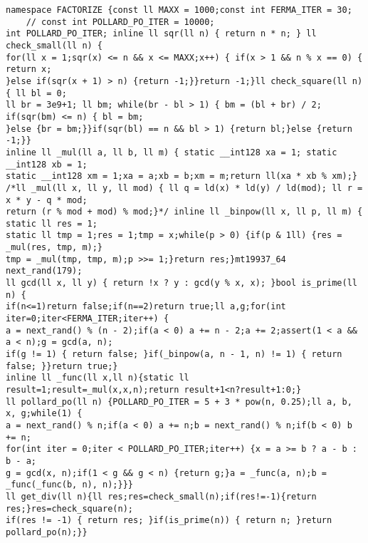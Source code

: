 \documentclass[a4paper,12pt]{article}
\begin{document}
\begin{verbatim}
namespace FACTORIZE {const ll MAXX = 1000;const int FERMA_ITER = 30;
    // const int POLLARD_PO_ITER = 10000;
int POLLARD_PO_ITER; inline ll sqr(ll n) { return n * n; } ll check_small(ll n) {
for(ll x = 1;sqr(x) <= n && x <= MAXX;x++) { if(x > 1 && n % x == 0) { return x;
}else if(sqr(x + 1) > n) {return -1;}}return -1;}ll check_square(ll n) { ll bl = 0;
ll br = 3e9+1; ll bm; while(br - bl > 1) { bm = (bl + br) / 2; if(sqr(bm) <= n) { bl = bm;
}else {br = bm;}}if(sqr(bl) == n && bl > 1) {return bl;}else {return -1;}}
inline ll _mul(ll a, ll b, ll m) { static __int128 xa = 1; static __int128 xb = 1;
static __int128 xm = 1;xa = a;xb = b;xm = m;return ll(xa * xb % xm);}
/*ll _mul(ll x, ll y, ll mod) { ll q = ld(x) * ld(y) / ld(mod); ll r = x * y - q * mod; 
return (r % mod + mod) % mod;}*/ inline ll _binpow(ll x, ll p, ll m) { static ll res = 1;
static ll tmp = 1;res = 1;tmp = x;while(p > 0) {if(p & 1ll) {res = _mul(res, tmp, m);}
tmp = _mul(tmp, tmp, m);p >>= 1;}return res;}mt19937_64 next_rand(179);
ll gcd(ll x, ll y) { return !x ? y : gcd(y % x, x); }bool is_prime(ll n) {
if(n<=1)return false;if(n==2)return true;ll a,g;for(int iter=0;iter<FERMA_ITER;iter++) {
a = next_rand() % (n - 2);if(a < 0) a += n - 2;a += 2;assert(1 < a && a < n);g = gcd(a, n);
if(g != 1) { return false; }if(_binpow(a, n - 1, n) != 1) { return false; }}return true;}
inline ll _func(ll x,ll n){static ll result=1;result=_mul(x,x,n);return result+1<n?result+1:0;}
ll pollard_po(ll n) {POLLARD_PO_ITER = 5 + 3 * pow(n, 0.25);ll a, b, x, g;while(1) {
a = next_rand() % n;if(a < 0) a += n;b = next_rand() % n;if(b < 0) b += n;
for(int iter = 0;iter < POLLARD_PO_ITER;iter++) {x = a >= b ? a - b : b - a;
g = gcd(x, n);if(1 < g && g < n) {return g;}a = _func(a, n);b = _func(_func(b, n), n);}}}
ll get_div(ll n){ll res;res=check_small(n);if(res!=-1){return res;}res=check_square(n);
if(res != -1) { return res; }if(is_prime(n)) { return n; }return pollard_po(n);}}
\end{verbatim}
\end{document}
